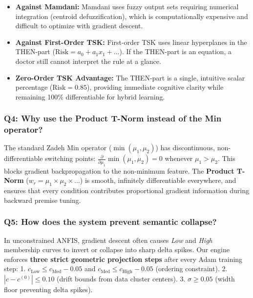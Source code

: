 \begin{itemize}
\tightlist
\item
  \textbf{Against Mamdani:} Mamdani uses fuzzy output sets requiring
  numerical integration (centroid defuzzification), which is
  computationally expensive and difficult to optimize with gradient
  descent.
\item
  \textbf{Against First-Order TSK:} First-order TSK uses linear
  hyperplanes in the THEN-part
  (\(\text{Risk} = a_0 + a_1 x_1 + \dots\)). If the THEN-part is an
  equation, a doctor still cannot interpret the rule at a glance.
\item
  \textbf{Zero-Order TSK Advantage:} The THEN-part is a single,
  intuitive scalar percentage (\(\text{Risk} = 0.85\)), providing
  immediate cognitive clarity while remaining 100\% differentiable for
  hybrid learning.
\end{itemize}

\subsubsection{Q4: Why use the Product T-Norm instead of the Min
operator?}\label{q4-why-use-the-product-t-norm-instead-of-the-min-operator}

The standard Zadeh Min operator (\(\min(\mu_1, \mu_2)\)) has
discontinuous, non-differentiable switching points:
\(\frac{\partial}{\partial \mu_1} \min(\mu_1, \mu_2) = 0\) whenever
\(\mu_1 > \mu_2\). This blocks gradient backpropagation to the
non-minimum feature. The \textbf{Product T-Norm}
(\(w_r = \mu_1 \times \mu_2 \times \dots\)) is smooth, infinitely
differentiable everywhere, and ensures that every condition contributes
proportional gradient information during backward premise tuning.

\subsubsection{Q5: How does the system prevent semantic
collapse?}\label{q5-how-does-the-system-prevent-semantic-collapse}

In unconstrained ANFIS, gradient descent often causes \emph{Low} and
\emph{High} membership curves to invert or collapse into sharp delta
spikes. Our engine enforces \textbf{three strict geometric projection
steps} after every Adam training step: 1.
\(c_{\text{Low}} \le c_{\text{Med}} - 0.05\) and
\(c_{\text{Med}} \le c_{\text{High}} - 0.05\) (ordering constraint). 2.
\(|c - c^{(0)}| \le 0.10\) (drift bounds from data cluster centers). 3.
\(\sigma \ge 0.05\) (width floor preventing delta spikes).

